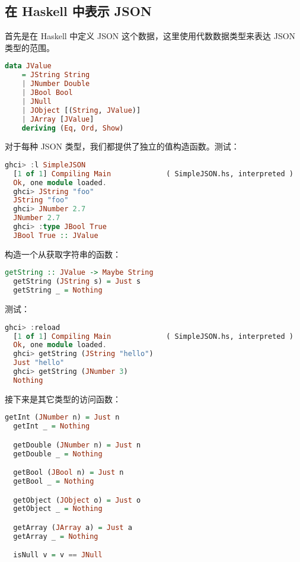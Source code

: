 \documentclass[./main.tex]{subfiles}
\begin{document}
\subsection*{在 Haskell 中表示 JSON}

首先是在 Haskell 中定义 JSON 这个数据，这里使用代数数据类型来表达 JSON 类型的范围。

\begin{lstlisting}[language=Haskell]
  data JValue
    = JString String
    | JNumber Double
    | JBool Bool
    | JNull
    | JObject [(String, JValue)]
    | JArray [JValue]
    deriving (Eq, Ord, Show)
\end{lstlisting}

对于每种 JSON 类型，我们都提供了独立的值构造函数。测试：

\begin{lstlisting}[language=Haskell]
  ghci> :l SimpleJSON
  [1 of 1] Compiling Main             ( SimpleJSON.hs, interpreted )
  Ok, one module loaded.
  ghci> JString "foo"
  JString "foo"
  ghci> JNumber 2.7
  JNumber 2.7
  ghci> :type JBool True
  JBool True :: JValue
\end{lstlisting}

构造一个从获取字符串的函数：

\begin{lstlisting}[language=Haskell]
  getString :: JValue -> Maybe String
  getString (JString s) = Just s
  getString _ = Nothing
\end{lstlisting}

测试：

\begin{lstlisting}[language=Haskell]
  ghci> :reload
  [1 of 1] Compiling Main             ( SimpleJSON.hs, interpreted )
  Ok, one module loaded.
  ghci> getString (JString "hello")
  Just "hello"
  ghci> getString (JNumber 3)
  Nothing
\end{lstlisting}

接下来是其它类型的访问函数：

\begin{lstlisting}[language=Haskell]
  getInt (JNumber n) = Just n
  getInt _ = Nothing

  getDouble (JNumber n) = Just n
  getDouble _ = Nothing

  getBool (JBool n) = Just n
  getBool _ = Nothing

  getObject (JObject o) = Just o
  getObject _ = Nothing

  getArray (JArray a) = Just a
  getArray _ = Nothing

  isNull v = v == JNull
\end{lstlisting}
\end{document}
